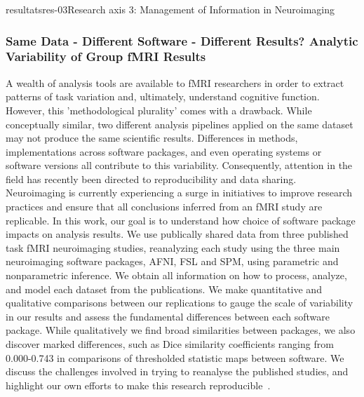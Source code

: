 \documentclass{ra2018}
\begin{document}
\begin{module}{resultats}{res-03}{Research axis 3: Management of Information in Neuroimaging}
\subsubsection{Same Data - Different Software - Different Results? Analytic Variability of Group fMRI Results}
\begin{participants}
\end{participants}
A wealth of analysis tools are available to fMRI researchers in order to extract patterns of task variation and, ultimately, understand cognitive function. However, this 'methodological plurality' comes with a drawback. While conceptually similar, two different analysis pipelines applied on the same dataset may not produce the same scientific results. Differences in methods, implementations across software packages, and even operating systems or software versions all contribute to this variability. Consequently, attention in the field has recently been directed to reproducibility and data sharing. Neuroimaging is currently experiencing a surge in initiatives to improve research practices and ensure that all conclusions inferred from an fMRI study are replicable. In this work, our goal is to understand how choice of software package impacts on analysis results. We use publically shared data from three published task fMRI neuroimaging studies, reanalyzing each study using the three main neuroimaging software packages, AFNI, FSL and SPM, using parametric and nonparametric inference. We obtain all information on how to process, analyze, and model each dataset from the publications. We make quantitative and qualitative comparisons between our replications to gauge the scale of variability in our results and assess the fundamental differences between each software package. While qualitatively we find broad similarities between packages, we also discover marked differences, such as Dice similarity coefficients ranging from 0.000-0.743 in comparisons of thresholded statistic maps between software. We discuss the challenges involved in trying to reanalyse the published studies, and highlight our own efforts to make this research reproducible~\cite{bowring:inserm-01933019,bowring:inserm-01760535}.


\end{module}
\end{document}
